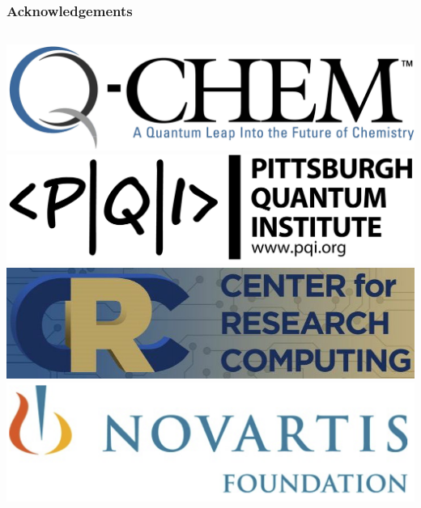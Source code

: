 \documentclass{beamer}
\begin{document}
\begin{frame}
  \frametitle{Acknowledgements}
  \begin{columns}
    \begin{minipage}{1.0\linewidth}
    \end{minipage}
    \begin{minipage}{1.0\linewidth}
      \centering
      \includegraphics[width=\linewidth,keepaspectratio]{./figures/Qchem-logo.png}
      \includegraphics[width=\linewidth,keepaspectratio]{./figures/PQI-Letter-Logo-black.png}
      \includegraphics[width=\linewidth,keepaspectratio]{./figures/logo_crc.jpg}
      \includegraphics[width=\linewidth,keepaspectratio]{./figures/logo_novartis.png}
    \end{minipage}
  \end{columns}
\end{frame}
\end{document}
